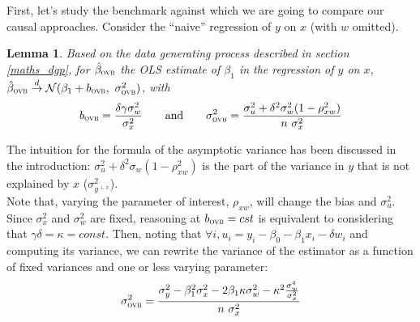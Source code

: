 \documentclass[usletter, 12pt]{article}
\newtheorem{lemma}{Lemma}
\begin{document}
				First, let's study the benchmark against which we are going to compare our causal approaches. Consider the ``naive'' regression of $y$ on $x$ (with $w$ omitted). 
%				
						
				\begin{lemma}\label{lemma_ovb}
					Based on the data generating process described in section \ref{maths_dgp}, for $\hat{\beta}_{\textsc{ovb}}$ the OLS estimate of $\beta_{1}$ in the regression of $y$ on $x$, $\hat{\beta}_{\textsc{ovb}} \overset{d}{\to} \mathcal{N}(\beta_{1} + b_{\textsc{ovb}} , \ \sigma_{\textsc{ovb}}^{2})$, with
					\[
						b_{\textsc{ovb}} = \dfrac{\delta \gamma \sigma_{w}^{2}}{\sigma_{x}^{2}} 
						\qquad \text{and} \qquad
						\sigma_{\textsc{ovb}}^{2} = \dfrac{\sigma_{u}^{2} + \delta^{2} \sigma_{w}^{2}(1 - \rho_{xw}^{2})}{n \ \sigma_{x}^{2}}
					\]
				\end{lemma}
				
			The intuition for the formula of the asymptotic variance has been discussed in the introduction: $\sigma_{u}^{2} + \delta^{2} \sigma_{w}(1 - \rho_{xw}^{2})$ is the part of the variance in $y$ that is not explained by $x$ ($\sigma^{2}_{y^{\perp x}}$).\\
			
			Note that, varying the parameter of interest, $\rho_{xw}$, will change the bias and $\sigma_{u}^{2}$. Since $\sigma_{x}^{2}$ and $\sigma_{w}^{2}$ are fixed, reasoning at $b_{\textsc{ovb}} = cst$ is equivalent to considering that $\gamma \delta = \kappa = const$. Then, noting that $\forall i, u_{i} = y_i - \beta_{0} - \beta_{1}x_{i} - \delta w_{i}$ and computing its variance, we can rewrite the variance of the estimator as a function of fixed variances and one or less varying parameter:
			~
			\[
				\sigma_{\textsc{ovb}}^{2} = \dfrac{\sigma_{y}^{2} - \beta_{1}^{2}\sigma_{x}^{2} - 2\beta_{1}\kappa\sigma_{w}^{2} - \kappa^{2}\frac{\sigma_{w}^{4}}{\sigma_{x}^{2}}}{n \ \sigma_{x}^{2}}
			\]
			
\end{document}
